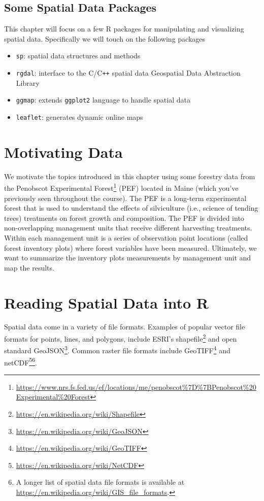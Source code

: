 \documentclass[]{krantz}
\providecommand{\tightlist}{%
  \setlength{\itemsep}{0pt}\setlength{\parskip}{0pt}}
\renewcommand{\href}[2]{#2\footnote{\url{#1}}}
\theoremstyle{definition}
\theoremstyle{definition}
\theoremstyle{definition}
\theoremstyle{remark}
\begin{document}
\subsection{Some Spatial Data
Packages}\label{some-spatial-data-packages}

This chapter will focus on a few R packages for manipulating and
visualizing spatial data. Specifically we will touch on the following
packages

\begin{itemize}
\tightlist
\item
  \texttt{sp}: spatial data structures and methods
\item
  \texttt{rgdal}: interface to the C/C\texttt{++} spatial data
  Geospatial Data Abstraction Library
\item
  \texttt{ggmap}: extends \texttt{ggplot2} language to handle spatial
  data
\item
  \texttt{leaflet}: generates dynamic online maps
\end{itemize}

\section{Motivating Data}\label{motivating-data}

We motivate the topics introduced in this chapter using some forestry
data from the
\href{https://www.nrs.fs.fed.us/ef/locations/me/penobscot\%7D\%7BPenobscot\%20Experimental\%20Forest}{Penobscot
Experimental Forest} (PEF) located in Maine (which you've previously
seen throughout the course). The PEF is a long-term experimental forest
that is used to understand the effects of silviculture (i.e., science of
tending trees) treatments on forest growth and composition. The PEF is
divided into non-overlapping management units that receive different
harvesting treatments. Within each management unit is a series of
observation point locations (called forest inventory plots) where forest
variables have been measured. Ultimately, we want to summarize the
inventory plots measurements by management unit and map the results.

\section{Reading Spatial Data into R}\label{reading-spatial-data-into-r}

Spatial data come in a variety of file formats. Examples of popular
vector file formats for points, lines, and polygons, include ESRI's
\href{https://en.wikipedia.org/wiki/Shapefile}{shapefile} and open
standard \href{https://en.wikipedia.org/wiki/GeoJSON}{GeoJSON}. Common
raster file formats include
\href{https://en.wikipedia.org/wiki/GeoTIFF}{GeoTIFF} and
\href{https://en.wikipedia.org/wiki/NetCDF}{netCDF}\footnote{A longer
  list of spatial data file formats is available at
  \url{https://en.wikipedia.org/wiki/GIS_file_formats}.}.
\end{document}
